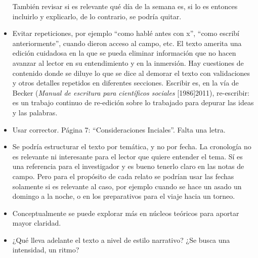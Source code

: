 \begin{itemize}
  También revisar si es relevante qué día de la semana es, si lo es
  entonces incluirlo y explicarlo, de lo contrario, se podría quitar.
\item
  Evitar repeticiones, por ejemplo ``como hablé antes con x'', ``como
  escribí anteriormente'', cuando dieron acceso al campo, etc. 
  El texto amerita una edición cuidadosa en la
  que se pueda eliminar información que no hacen avanzar al lector en su
  entendimiento y en la inmersión.
  Hay cuestiones de contenido donde se diluye lo que se dice al demorar el texto con validaciones y otros detalles repetidos en diferentes secciones.
  Escribir es, en la vía de Becker (\textit{Manual de escritura para científicos sociales} [1986]2011), re-escribir:
  es un trabajo continuo de re-edición sobre lo trabajado para depurar las ideas y las palabras.
\item
  Usar corrector. Página 7: ``Consideraciones Inciales''. Falta una letra.
\item 
  Se podría estructurar el texto por temática, y no por fecha.
  La cronología no es relevante ni interesante para el
  lector que quiere entender el tema.
  Sí es una referencia para el
  investigador y es bueno tenerlo claro en las notas de campo.
  Pero para el propósito de cada relato se podrían usar las fechas solamente si es relevante al caso,
  por ejemplo cuando se hace un asado un domingo a la noche, o en los
  preparativos para el viaje hacia un torneo.
\item Conceptualmente se puede explorar más en núcleos teóricos para aportar mayor claridad.
\item 
  ¿Qué lleva adelante el texto a nivel de estilo narrativo? 
  ¿Se busca una intensidad, un ritmo?
\end{itemize}